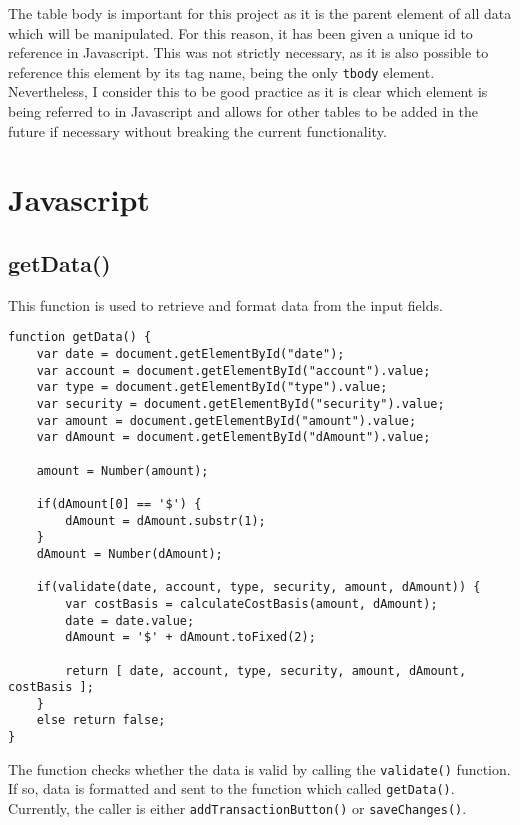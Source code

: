 \documentclass[letterpaper]{article}
\begin{document}
The table body is important for this project as it is the parent element of all data which will be manipulated.
For this reason, it has been given a unique id to reference in Javascript.
This was not strictly necessary, as it is also possible to reference this element by its tag name, being the only \lstinline{tbody} element.
Nevertheless, I consider this to be good practice as it is clear which element is being referred to in Javascript and allows for other tables to be added in the future if necessary without breaking the current functionality.

\newpage

\section{Javascript}\label{JS}

\subsection{getData()}

This function is used to retrieve and format data from the input fields.

\begin{lstlisting}[firstnumber=1]
function getData() {
    var date = document.getElementById("date");
    var account = document.getElementById("account").value;
    var type = document.getElementById("type").value;
    var security = document.getElementById("security").value;
    var amount = document.getElementById("amount").value;
    var dAmount = document.getElementById("dAmount").value;

    amount = Number(amount);

    if(dAmount[0] == '$') {
        dAmount = dAmount.substr(1);
    }
    dAmount = Number(dAmount);

    if(validate(date, account, type, security, amount, dAmount)) {
        var costBasis = calculateCostBasis(amount, dAmount);
        date = date.value;
        dAmount = '$' + dAmount.toFixed(2);

        return [ date, account, type, security, amount, dAmount, costBasis ];
    }
    else return false;
}
\end{lstlisting}

The function checks whether the data is valid by calling the \lstinline{validate()} function.
If so, data is formatted and sent to the function which called \lstinline{getData()}.
Currently, the caller is either \lstinline{addTransactionButton()} or \lstinline{saveChanges()}.
\end{document}
